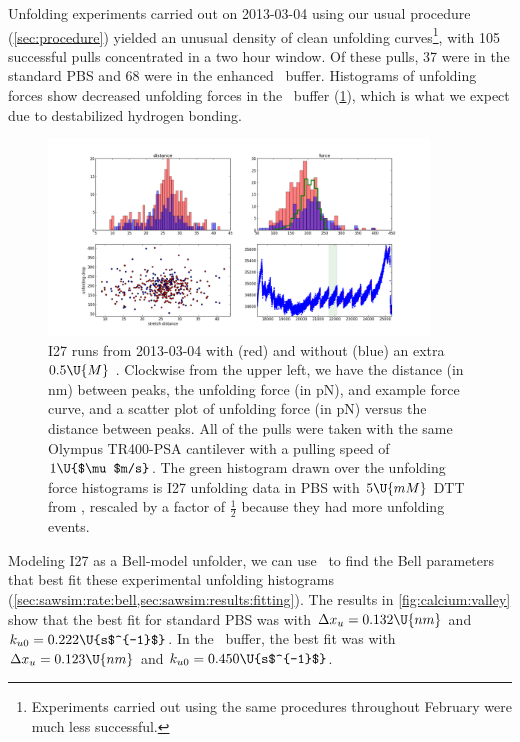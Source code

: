Unfolding experiments carried out on 2013-03-04 using our usual
procedure (\cref{sec:procedure}) yielded an unusual density of clean
unfolding curves\footnote{
  Experiments carried out using the same procedures throughout
  February were much less successful.
},
with 105 successful pulls concentrated in a two hour window.  Of these
pulls, 37 were in the standard PBS and 68 were in the enhanced
\Ca\ buffer.  Histograms of unfolding forces show decreased
unfolding forces in the \Ca\ buffer (\cref{fig:calcium:histogram}),
which is what we expect due to destabilized hydrogen bonding.

\begin{figure}
  \begin{center}
    \includegraphics[width=0.9\textwidth]{figures/salt/2013-03-04-CaCl2}
    \caption{I27 runs from 2013-03-04 with (red) and without (blue) an
      extra $0.5\U{M}$ \Ca.  Clockwise from the upper left, we have
      the distance (in nm) between peaks, the unfolding force (in pN),
      and example force curve, and a scatter plot of unfolding force
      (in pN) versus the distance between peaks.  All of the pulls
      were taken with the same Olympus TR400-PSA cantilever with a
      pulling speed of $1\U{$\mu$m/s}$.  The green histogram drawn
      over the unfolding force histograms is I27 unfolding data in PBS
      with $5\U{mM}$ DTT from \citet{carrion-vazquez99b}, rescaled by
      a factor of $\frac{1}{2}$ because they had more unfolding
      events.\label{fig:calcium:histogram}}
  \end{center}
\end{figure}
%

Modeling I27 as a Bell-model unfolder, we can use \sawsim\ to find the
Bell parameters that best fit these experimental unfolding histograms
(\cref{sec:sawsim:rate:bell,sec:sawsim:results:fitting}).  The results
in \cref{fig:calcium:valley} show that the best fit for standard PBS
was with $\Delta x_u=0.132\U{nm}$ and $k_{u0}=0.222\U{s$^{-1}$}$.  In
the \Ca\ buffer, the best fit was with $\Delta x_u=0.123\U{nm}$ and
$k_{u0}=0.450\U{s$^{-1}$}$.

